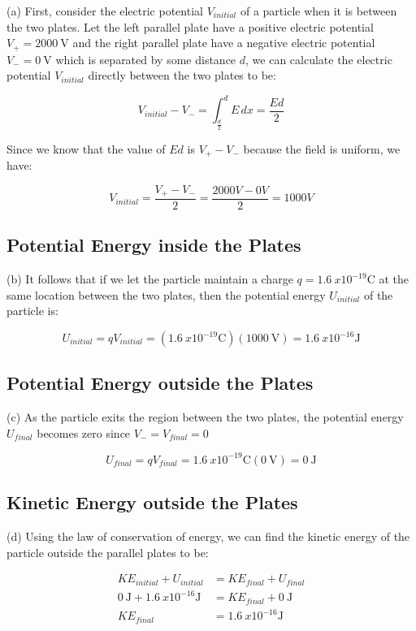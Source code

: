 \documentclass[12pt]{article}
\begin{document}
(a) First, consider the electric potential $V_{initial}$ of a particle when it is between the two plates. Let the left parallel plate have a positive electric potential $V_+=\SI{2000}{\volt}$ and the right parallel plate have a negative electric potential $V_-=\SI{0}{\volt}$ which is separated by some distance $d$, we can calculate the electric potential $V_{initial}$ directly between the two plates to be:

\[V_{initial} - V_- = \int_{\frac{d}{2}}^{d} E\,dx= \frac{Ed}{2}\]

Since we know that the value of $Ed$ is $V_+ - V_-$ because the field is uniform, we have:

\[V_{initial} = \frac{V_+-V_-}{2} = \frac{2000 V - 0 V}{2} = 1000 V\]
\subsection{Potential Energy inside the Plates}

(b) It follows that if we let the particle maintain a charge $q=\SI{1.6}{x10^{-19} \coulomb}$ at the same location between the two plates, then the potential energy $U_{initial}$ of the particle is:

\[U_{initial} = qV_{initial} = (\SI{1.6}{x10^{-19} \coulomb})(\SI{1000}{\volt}) = \SI{1.6}{x10^{-16} \joule}\]

\subsection{Potential Energy outside the Plates}
(c) As the particle exits the region between the two plates, the potential energy $U_{final}$ becomes zero since $V_-= V_{final} = 0$

\[U_{final} = qV_{final} = \SI{1.6}{x10^{-19} \coulomb}(\SI{0}{\volt}) = \SI{0}{\joule}\]

\subsection{Kinetic Energy outside the Plates}
(d) Using the law of conservation of energy, we can find the kinetic energy of the particle outside the parallel plates to be:

\begin{equation*}
    \begin{split}
        KE_{initial} + U_{initial} & = KE_{final} + U_{final} \\
        \SI{0}{\joule} + \SI{1.6}{x10^{-16} \joule} & = KE_{final} + \SI{0}{\joule} \\
        KE_{final} & = \SI{1.6}{x10^{-16} \joule}
    \end{split}
\end{equation*}
\end{document}
